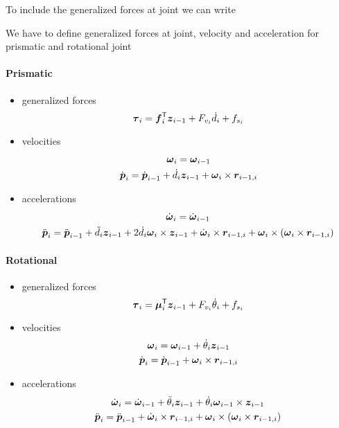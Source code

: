 To include the generalized forces at joint we can write

We have to define generalized forces at joint, velocity and acceleration for prismatic and rotational joint

\paragraph{Prismatic}
\begin{itemize}
	\item generalized forces
	\[ \boldsymbol{\tau}_i = \boldsymbol{f}_i^{\mathsf{T}} \boldsymbol{z}_{i-1} + F_{v_i}\dot{d}_i + f_{s_i} \]

	\item velocities
	\begin{gather*}
		\boldsymbol{\omega}_i = \boldsymbol{\omega}_{i-1} \\
		\dot{\boldsymbol{p}}_i = \dot{\boldsymbol{p}}_{i-1} + \dot{d}_i \boldsymbol{z}_{i-1} + \boldsymbol{\omega}_i \times \boldsymbol{r}_{i-1,i}
	\end{gather*}

	\item accelerations
	\begin{gather*}
		\dot{\boldsymbol{\omega}}_i = \dot{\boldsymbol{\omega}}_{i-1} \\
		\ddot{\boldsymbol{p}}_i = \ddot{\boldsymbol{p}}_{i-1} +
		\ddot{d}_i \boldsymbol{z}_{i-1} + 2\dot d_i \boldsymbol{\omega}_i \times \boldsymbol{z}_{i-1} +
		\dot{\boldsymbol{\omega}}_i \times \boldsymbol{r}_{i-1,i} + \boldsymbol{\omega}_i \times (\boldsymbol{\omega}_i \times \boldsymbol{r}_{i-1,i})
	\end{gather*}
\end{itemize}

\paragraph{Rotational}
\begin{itemize}
	\item generalized forces
	\[ \boldsymbol{\tau}_i = \boldsymbol{\mu}_i^{\mathsf{T}} \boldsymbol{z}_{i-1} + F_{v_i}\dot{\theta}_i + f_{s_i} \]

	\item velocities
	\begin{gather*}
		\boldsymbol{\omega}_i = \boldsymbol{\omega}_{i-1} + \dot{\theta}_i \boldsymbol{z}_{i-1} \\
		\dot{\boldsymbol{p}}_i = \dot{\boldsymbol{p}}_{i-1} + \boldsymbol{\omega}_i \times \boldsymbol{r}_{i-1,i}
	\end{gather*}

	\item accelerations
	\begin{gather*}
		\dot{\boldsymbol{\omega}}_i = \dot{\boldsymbol{\omega}}_{i-1} + \ddot{\theta}_i \boldsymbol{z}_{i-1} + \dot \theta_i \boldsymbol{\omega}_{i-1} \times \boldsymbol{z}_{i-1}\\
		\ddot{\boldsymbol{p}}_i = \ddot{\boldsymbol{p}}_{i-1} +
		\dot{\boldsymbol{\omega}}_i \times \boldsymbol{r}_{i-1,i} + \boldsymbol{\omega}_i \times (\boldsymbol{\omega}_i \times \boldsymbol{r}_{i-1,i})
	\end{gather*}
\end{itemize}

